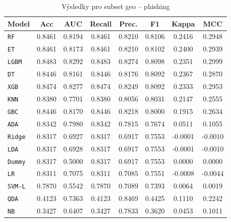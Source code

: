 \begin{table}[H]
  \centering
  \small
  \caption{Výsledky pro subset geo – phishing}
  \begin{tabular}{|l|c|c|c|c|c|c|c|}
    \hline
    \textbf{Model} & \textbf{Acc} & \textbf{AUC} & \textbf{Recall} & \textbf{Prec.} & \textbf{F1} & \textbf{Kappa} & \textbf{MCC} \\
    \hline
    \texttt{RF} & 0.8461 & 0.8194 & 0.8461 & 0.8210 & 0.8106 & 0.2416 & 0.2948 \\
    \texttt{ET} & 0.8461 & 0.8173 & 0.8461 & 0.8210 & 0.8102 & 0.2400 & 0.2939 \\
    \texttt{LGBM} & 0.8483 & 0.8292 & 0.8483 & 0.8274 & 0.8098 & 0.2351 & 0.2999 \\
    \texttt{DT} & 0.8446 & 0.8161 & 0.8446 & 0.8176 & 0.8092 & 0.2367 & 0.2870 \\
    \texttt{XGB} & 0.8474 & 0.8277 & 0.8474 & 0.8249 & 0.8092 & 0.2333 & 0.2953 \\
    \texttt{KNN} & 0.8380 & 0.7701 & 0.8380 & 0.8056 & 0.8031 & 0.2147 & 0.2555 \\
    \texttt{GBC} & 0.8446 & 0.8170 & 0.8446 & 0.8218 & 0.8000 & 0.1915 & 0.2634 \\
    \texttt{ADA} & 0.8342 & 0.7980 & 0.8342 & 0.7815 & 0.7674 & 0.0511 & 0.1055 \\
    \texttt{Ridge} & 0.8317 & 0.6927 & 0.8317 & 0.6917 & 0.7553 & -0.0001 & -0.0010 \\
    \texttt{LDA} & 0.8317 & 0.6928 & 0.8317 & 0.6917 & 0.7553 & -0.0001 & -0.0010 \\
    \texttt{Dummy} & 0.8317 & 0.5000 & 0.8317 & 0.6917 & 0.7553 & 0.0000 & 0.0000 \\
    \texttt{LR} & 0.8311 & 0.7075 & 0.8311 & 0.7085 & 0.7551 & -0.0008 & -0.0044 \\
    \texttt{SVM-L} & 0.7870 & 0.5542 & 0.7870 & 0.7089 & 0.7393 & 0.0064 & 0.0019 \\
    \texttt{QDA} & 0.4123 & 0.7363 & 0.4123 & 0.8469 & 0.4425 & 0.1110 & 0.2242 \\
    \texttt{NB} & 0.3427 & 0.6407 & 0.3427 & 0.7833 & 0.3620 & 0.0453 & 0.1011 \\
    \hline
  \end{tabular}
\end{table}
\vspace{0.5cm}

